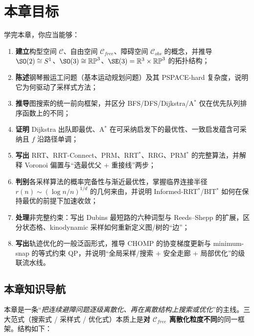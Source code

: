 \section*{本章目标}
学完本章，你应当能够：
\begin{enumerate}
  \item \textbf{建立}构型空间 $\mathcal{C}$、自由空间 $\mathcal{C}_{free}$、障碍空间 $\mathcal{C}_{obs}$ 的概念，并推导 $\SO(2)\cong S^1$、$\SO(3)\cong\mathbb{RP}^3$、$\SE(3)=\mathbb{R}^3\times\mathbb{RP}^3$ 的拓扑结构；
  \item \textbf{陈述}钢琴搬运工问题（基本运动规划问题）及其 PSPACE-hard 复杂度，说明它为何驱动了采样式方法；
  \item \textbf{推导}图搜索的统一前向框架，并区分 BFS/DFS/Dijkstra/A$^*$ 仅在优先队列排序函数上的不同；
  \item \textbf{证明} Dijkstra 出队即最优、A$^*$ 在可采纳启发下的最优性、一致启发蕴含可采纳且 $f$ 沿路径单调；
  \item \textbf{写出} RRT、RRT-Connect、PRM、RRT$^*$、RRG、PRM$^*$ 的完整算法，并解释 Voronoi 偏置与“选最优父 + 重接线”两步；
  \item \textbf{判别}各采样算法的概率完备性与渐近最优性，掌握临界连接半径 $r(n)\sim(\log n/n)^{1/d}$ 的几何来由，并说明 Informed-RRT$^*$/BIT$^*$ 如何在保持最优的前提下加速收敛；
  \item \textbf{处理}非完整约束：写出 Dubins 最短路的六种词型与 Reeds--Shepp 的扩展，区分状态格、kinodynamic 采样如何重新定义图/树的“边”；
  \item \textbf{写出}轨迹优化的一般泛函形式，推导 CHOMP 的协变梯度更新与 minimum-snap 的等式约束 QP，并说明“全局采样/搜索 + 安全走廊 + 局部优化”的级联流水线。
\end{enumerate}

\subsection*{本章知识导航}
本章是一条“\emph{把连续避障问题逐级离散化、再在离散结构上搜索或优化}”的主线。三大范式（搜索式 / 采样式 / 优化式）本质上是\textbf{对 $\mathcal{C}_{free}$ 离散化粒度不同}的同一框架。结构如下：

